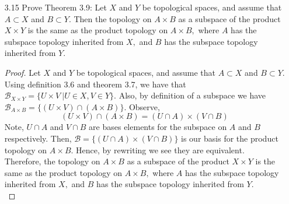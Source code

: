 \documentclass[12pt]{article}
\newcommand{\BB}{\mathcal{B}}
\begin{document}
\begin{enumerate}
		\item[3.15] Prove Theorem 3.9: Let $X$ and $Y$ be topological spaces, and assume that
		$A \subset X$ and $B \subset Y .$ Then the topology on $A \times B$ as a subspace of the product
		$X \times Y$ is the same as the product topology on $A \times B,$ where $A$ has the subspace topology inherited from $X,$ and $B$ has the subspace topology inherited from $Y$.\\
		\begin{proof}
		  Let $X$ and $Y$ be topological spaces, and assume that $A \subset X$ and $B \subset Y .$ Using definition 3.6 and theorem 3.7, we have that $\BB_{X\times Y} = \{U\times V\ |U\in X, V\in Y \} $. Also, by definition of a subspace we have $ \BB_{A\times B}=\{(U\times V)\cap(A\times B) \} $. Observe,
		  \[(U\times V)\cap(A\times B)=(U\cap A)\times(V\cap B) \]
		  Note, $ U\cap A $ and $ V\cap B $ are bases elements for the subspace on $ A $ and $ B $ respectively. Then, $ \BB=\{(U\cap A)\times(V\cap B) \}$ is our basis for the product topology on $ A\times B $. Hence, by rewriting we see they are equivalent.\\
		  Therefore, the topology on $A \times B$ as a subspace of the product
		  $X \times Y$ is the same as the product topology on $A \times B,$ where $A$ has the subspace topology inherited from $X,$ and $B$ has the subspace topology inherited from $Y$.\\
 		\end{proof}
		

\end{enumerate}
\end{document}
